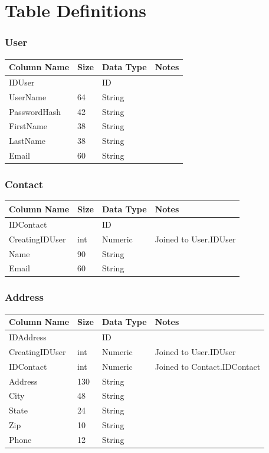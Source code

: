 \part{Table Definitions}

\section{User}
\begin{small}
\begin{tabularx}{\textwidth}{ l l l X }
\textbf{Column Name} & \textbf{Size} & \textbf{Data Type} & \textbf{Notes} \\ \hline 
IDUser &  & ID &  \\ 
UserName & 64 & String &  \\ 
PasswordHash & 42 & String &  \\ 
FirstName & 38 & String &  \\ 
LastName & 38 & String &  \\ 
Email & 60 & String &  \\ 
\end{tabularx}
\end{small}

\section{Contact}
\begin{small}
\begin{tabularx}{\textwidth}{ l l l X }
\textbf{Column Name} & \textbf{Size} & \textbf{Data Type} & \textbf{Notes} \\ \hline 
IDContact &  & ID &  \\ 
CreatingIDUser & int & Numeric & Joined to User.IDUser
 \\ 
Name & 90 & String &  \\ 
Email & 60 & String &  \\ 
\end{tabularx}
\end{small}

\section{Address}
\begin{small}
\begin{tabularx}{\textwidth}{ l l l X }
\textbf{Column Name} & \textbf{Size} & \textbf{Data Type} & \textbf{Notes} \\ \hline 
IDAddress &  & ID &  \\ 
CreatingIDUser & int & Numeric & Joined to User.IDUser
 \\ 
IDContact & int & Numeric & Joined to Contact.IDContact
 \\ 
Address & 130 & String &  \\ 
City & 48 & String &  \\ 
State & 24 & String &  \\ 
Zip & 10 & String &  \\ 
Phone & 12 & String &  \\ 
\end{tabularx}
\end{small}
